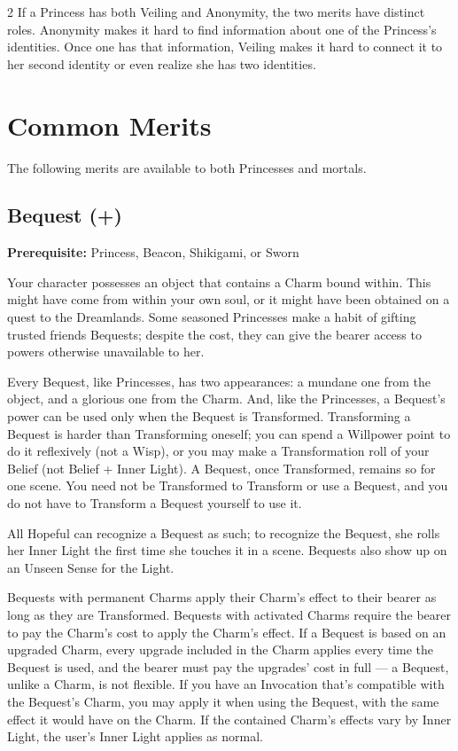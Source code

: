 \begin{multicols}{2}
If a Princess has both Veiling and Anonymity, the two merits have distinct roles. Anonymity makes it hard to find information about one of the Princess's identities. Once one has that information, Veiling makes it hard to connect it to her second identity or even realize she has two identities. 

\section*{Common Merits}
The following merits are available to both Princesses and mortals. 

\subsection*{Bequest (\textbullet +)}

\textbf{Prerequisite:} Princess, Beacon, Shikigami, or Sworn

Your character possesses an object that contains a Charm bound within. This might have come from within your own soul, or it might have been obtained on a quest to the Dreamlands. Some seasoned Princesses make a habit of gifting trusted friends Bequests; despite the cost, they can give the bearer access to powers otherwise unavailable to her. 

Every Bequest, like Princesses, has two appearances: a mundane one from the object, and a glorious one from the Charm. And, like the Princesses, a Bequest's power can be used only when the Bequest is Transformed. Transforming a Bequest is harder than Transforming oneself; you can spend a Willpower point to do it reflexively (not a Wisp), or you may make a Transformation roll of your Belief (not Belief + Inner Light). A Bequest, once Transformed, remains so for one scene. You need not be Transformed to Transform or use a Bequest, and you do not have to Transform a Bequest yourself to use it.

All Hopeful can recognize a Bequest as such; to recognize the Bequest, she rolls her Inner Light the first time she touches it in a scene. Bequests also show up on an Unseen Sense for the Light.

Bequests with permanent Charms apply their Charm's effect to their bearer as long as they are Transformed. Bequests with activated Charms require the bearer to pay the Charm's cost to apply the Charm's effect. If a Bequest is based on an upgraded Charm, every upgrade included in the Charm applies every time the Bequest is used, and the bearer must pay the upgrades' cost in full — a Bequest, unlike a Charm, is not flexible. If you have an Invocation that's compatible with the Bequest's Charm, you may apply it when using the Bequest, with the same effect it would have on the Charm. If the contained Charm's effects vary by Inner Light, the user's Inner Light applies as normal.


\end{multicols}
